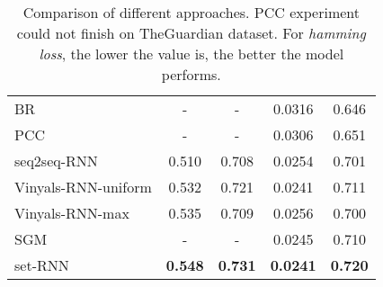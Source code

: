 \begin{table*}[ht]
\begin{center}
\begin{tabular}{|l|cccc|}
            BR
            & - & - & 0.0316 & 0.646  \\
            PCC 
            & - & - & 0.0306 & 0.651 \\
            seq2seq-RNN  
             & 0.510 & 0.708 & 0.0254 & 0.701 \\
            Vinyals-RNN-uniform 
             & 0.532 & 0.721 & 0.0241 & 0.711 \\
            Vinyals-RNN-max
            & 0.535 & 0.709 & 0.0256 & 0.700 \\
            SGM
            & - & - & 0.0245 & 0.710 \\
            set-RNN 
             & \textbf{0.548} & \textbf{0.731} & \textbf{0.0241} & \textbf{0.720} \\
            \hline

		\end{tabular}
	\end{center}
	\caption{Comparison of different approaches. PCC experiment could not finish on TheGuardian dataset. For \emph{hamming loss}, the lower the value is, the better the model performs. %
    }\label{tab:main}
\end{table*}





